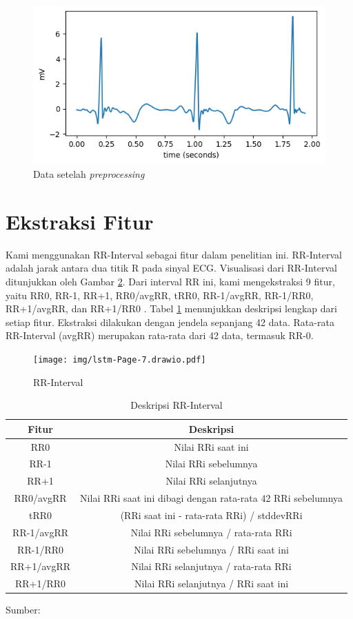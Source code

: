 \begin{figure}[H]
  \centering
  \includegraphics[width=0.6\linewidth]{./img/setelah_prep.png}
  \caption{Data setelah \textit{preprocessing}}
  \label{fig:setelah-prep}
\end{figure}


\section{Ekstraksi Fitur}
\label{subsec: metodologi-ekstraksi-fitur}

Kami menggunakan RR-Interval sebagai fitur dalam penelitian ini. RR-Interval adalah jarak antara dua titik R pada sinyal ECG. Visualisasi dari RR-Interval ditunjukkan oleh Gambar \ref{fig:rri}. Dari interval RR ini, kami mengekstraksi 9 fitur, yaitu RR0, RR-1, RR+1, RR0/avgRR, tRR0, RR-1/avgRR, RR-1/RR0, RR+1/avgRR, dan RR+1/RR0 \parencite{pramukantoroHeartbeatClassifierContinuous2022}. Tabel \ref{tab:rri} menunjukkan deskripsi lengkap dari setiap fitur. Ekstraksi dilakukan dengan jendela sepanjang 42 data. Rata-rata RR-Interval (avgRR) merupakan rata-rata dari 42 data, termasuk RR-0. 

\begin{figure}[H]
  \centering
  \texttt{[image: img/lstm-Page-7.drawio.pdf]}
  \caption{RR-Interval}
  \label{fig:rri}
\end{figure}

\begin{table}[H]
  \caption{Deskripsi RR-Interval}
\begin{center}
\footnotesize
\begin{tabular}{c @{\hspace{1cm}} c}
\hline
Fitur & Deskripsi\\
\hline
RR0 & Nilai RRi saat ini\\
RR-1 & Nilai RRi sebelumnya\\
RR+1  & Nilai RRi selanjutnya\\
RR0/avgRR & Nilai RRi saat ini dibagi dengan rata-rata 42 RRi sebelumnya\\
tRR0  & (RRi saat ini - rata-rata RRi) / stddevRRi\\
RR-1/avgRR & Nilai RRi sebelumnya / rata-rata RRi\\
RR-1/RR0 & Nilai RRi sebelumnya / RRi saat ini\\
RR+1/avgRR & Nilai RRi selanjutnya / rata-rata RRi\\
RR+1/RR0 & Nilai RRi selanjutnya / RRi saat ini\\
\hline
\end{tabular}
\end{center}
\center
Sumber: \textcite{pramukantoroHeartbeatClassifierContinuous2022}
\label{tab:rri}
\end{table}

